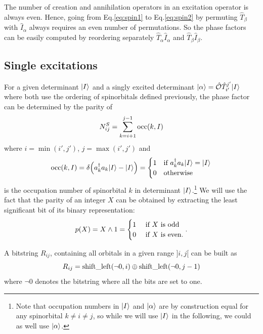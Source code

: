 \documentclass[./thesis.tex]{subfiles}
\begin{document}
The number of creation and annihilation operators in an excitation operator is always even. Hence, going from Eq.\eqref{eq:spin1} to Eq.\eqref{eq:spin2} by permuting $\hat{T}_\beta$ with $\hat{I}_\alpha$ always requires an even number of permutations.
So the phase factors can be easily computed by reordering separately $\hat{T}_\alpha \hat{I}_\alpha$ and $\hat{T}_\beta  \hat{I}_\beta$.



\subsection{Single excitations}


For a given determinant ${\ket{I}}$ and a singly excited determinant ${\ket{\alpha}} = {\hat{\mathcal{O}}} {\hat{T}_{i'}^{j'}} {\ket{I}}$ where both 
use the ordering of spinorbitals defined previously, the phase factor can be determined by the parity of
\begin{equation}
N^{S}_{ij}=\sum_{k=i+1}^{j-1} {\text{occ}(k,I)}
\end{equation}
where $i=\min(i',j')$, $j=\max(i',j')$ and
\begin{equation}
{\text{occ}(k,I)} = \delta \qty(a^\dagger_{k}a_{k} {\ket{I}} - {\ket{I}}) = \begin{cases}
 1 & \text{if } a^\dagger_{k}a_{k} {\ket{I}} = {\ket{I}} \\
 0 & \text{otherwise}
\end{cases}
\end{equation}
is the occupation number of spinorbital $k$ in determinant ${\ket{I}}$.\footnote{Note that occupation
numbers in ${\ket{I}}$ and ${\ket{\alpha}}$ are by construction equal for any spinorbital $k \neq i \neq j$, so while we will use ${\ket{I}}$ in the following, we could as well use ${\ket{\alpha}}$.
}
We will use the fact that the parity of an integer $X$ can be obtained by extracting the least significant bit of its binary representation: 
\begin{equation}
p(X)=X \wedge 1 = \begin{cases}
1 & \text{ if $X$ is odd  } \\
0 & \text{ if $X$ is even.} 
\end{cases}.
\end{equation}


A bitstring $R_{ij}$, containing all orbitals in a given range $]i, j[$ can be built as 
\begin{equation}
R_{ij}=\text{shift\_left}(\neg{0},i) \oplus \text{shift\_left}(\neg{0},j-1)
\end{equation}
where $\neg{0}$ denotes the bitstring where all the bits are set to one.
\end{document}
